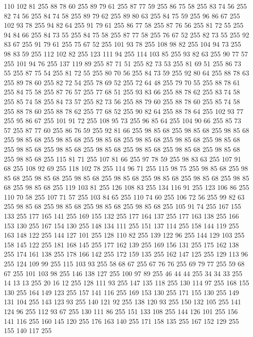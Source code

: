 110 102 81 255 88 78 60 255 89 79 61 255 87 77 59 255 86 75 58 255 83 74 56 255 82 74 56 255 84 74 58 255 89 79 62 255 89 80 63 255 84 75 59 255 96 86 67 255 102 93 78 255 94 82 64 255 91 79 61 255 86 77 58 255 87 76 56 255 81 72 55 255 94 84 66 255 84 73 55 255 84 75 58 255 87 77 58 255 76 67 52 255 82 73 55 255 92 83 67 255 91 79 61 255 75 67 52 255 101 93 78 255 108 98 82 255 104 94 73 255 98 83 59 255 112 102 82 255 123 111 94 255 114 103 85 255 93 82 63 255 90 77 57 255 101 94 76 255 137 119 89 255 87 71 51 255 82 73 53 255 81 69 51 255 86 73 55 255 87 75 54 255 81 72 55 255 80 70 56 255 84 73 59 255 92 80 64 255 88 78 63 255 89 78 60 255 82 72 54 255 78 69 52 255 72 64 48 255 79 70 55 255 88 78 61 255 84 75 58 255 87 76 57 255 77 68 51 255 93 83 66 255 88 78 62 255 83 74 58 255 85 74 58 255 84 73 57 255 82 73 56 255 88 79 60 255
88 78 60 255 85 74 58 255 88 78 60 255 88 78 62 255 77 68 52 255 90 82 64 255 88 78 64 255 102 93 77 255 95 86 67 255 101 91 72 255 108 95 73 255 96 85 64 255 104 90 66 255 85 73 57 255 87 77 60 255 86 76 59 255 92 81 66 255 98 85 68 255 98 85 68 255 98 85 68 255 98 85 68 255 98 85 68 255 98 85 68 255 98 85 68 255 98 85 68 255 98 85 68 255 98 85 68 255 98 85 68 255 98 85 68 255 98 85 68 255 98 85 68 255 98 85 68 255 98 85 68 255 115 81 71 255 107 81 66 255 97 78 59 255 98 83 63 255 107 91 68 255 108 92 69 255 118 102 78 255 114 96 71 255 115 98 75 255 98 85 68 255 98 85 68 255 98 85 68 255 98 85 68 255 98 85 68 255 98 85 68 255 98 85 68 255 98 85 68 255 98 85 68 255 119 103 81 255 126 108 83 255 134 116 91 255 123 106 86 255 110 70 58 255 107 71 57 255 103 84 65 255 110 74 60 255 106 72 56 255 99 82 63 255 98 85 68 255 98 85 68 255 98 85 68 255
98 85 68 255 105 91 74 255 167 155 133 255 177 165 141 255 169 155 132 255 177 164 137 255 177 163 138 255 166 153 130 255 167 154 130 255 148 134 111 255 151 137 114 255 158 144 119 255 163 148 122 255 144 127 101 255 128 110 82 255 139 122 96 255 144 129 103 255 158 145 122 255 181 168 145 255 177 162 139 255 169 156 131 255 175 162 138 255 174 161 138 255 178 166 142 255 172 159 135 255 162 147 125 255 129 113 96 255 124 109 99 255 115 103 93 255 58 68 67 255 67 76 76 255 69 79 77 255 59 68 67 255 101 103 98 255 146 138 127 255 100 97 89 255 46 44 44 255 34 34 33 255 14 13 13 255 20 16 12 255 128 111 93 255 147 135 118 255 130 114 97 255 168 155 130 255 164 149 123 255 157 141 116 255 169 153 130 255 171 155 130 255 149 131 104 255 143 123 93 255 140 121 92 255 138 120 93 255 150 132 105 255 141 124 96 255 112 93 67 255 130 111 86 255 151 133 108 255 144 126 101 255 156 141 116 255 160 145 120 255 176 163 140 255 171 158 135 255 167 152 129 255 155 140 117 255
